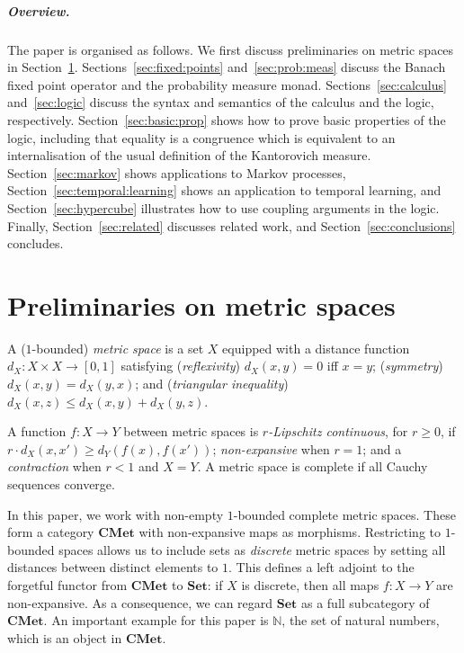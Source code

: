 \documentclass[a4paper,UKenglish,cleveref, autoref, thm-restate]{lipics-v2021}
\newcommand{\cat}[1]{\mathbf{#1}}
\newcommand{\CMet}{\cat{CMet}}
\newcommand{\Set}{\cat{Set}}
\newcommand{\nat}{\mathbb{N}}
\newcommand{\uinterval}{[0,1]}
\begin{document}
\subparagraph*{Overview.} The paper is organised as follows. We first discuss preliminaries on metric spaces in 
Section~\ref{sec:prelim}. Sections~\ref{sec:fixed:points} and~\ref{sec:prob:meas} discuss the 
Banach fixed point operator and the probability measure monad. Sections~\ref{sec:calculus} and~\ref{sec:logic}
discuss the syntax and semantics of the calculus and the logic, respectively. 
Section~\ref{sec:basic:prop} shows how to prove basic properties of the logic, including that equality is a congruence 
which is equivalent to an internalisation of the 
usual definition of the Kantorovich measure. Section~\ref{sec:markov} shows applications to Markov processes, 
Section~\ref{sec:temporal:learning} shows an application to temporal learning, and Section~\ref{sec:hypercube}
illustrates how to use coupling arguments in the logic. 
Finally, Section~\ref{sec:related} discusses related work, and 
Section~\ref{sec:conclusions} concludes. 

\section{Preliminaries on metric spaces}
\label{sec:prelim}

A ($1$-bounded) \emph{metric space} is a set $X$ equipped with a
distance function $d_X \colon X \times X \to \uinterval$ satisfying (\emph{reflexivity}) $d_X(x,y) =0$ iff $x=y$; (\emph{symmetry}) $d_X(x,y) = d_X(y,x)$; and (\emph{triangular inequality}) $d_X(x,z) \leq d_X(x,y) + d_X(y,z)$. 

A function $f \colon X \to Y$ between metric spaces is \emph{$r$-Lipschitz continuous}, for $r\geq 0$, if $r \cdot d_X(x,x') \geq  d_Y(f(x),f(x'))$; \emph{non-expansive} when $r = 1$; and a \emph{contraction} when $r < 1$ and $X = Y$. 
A metric space is complete if all Cauchy sequences converge. 

\smallskip
In this paper, we work with non-empty $1$-bounded complete metric spaces. 
These form a category $\CMet$ with non-expansive maps as morphisms. 
Restricting to $1$-bounded spaces allows us to include sets as \emph{discrete} metric spaces by setting all distances between distinct elements to $1$. 
This defines a left adjoint to the forgetful functor from $\CMet$ to $\Set$: if $X$ is discrete, then all maps 
$f\colon X \to Y$ are non-expansive. 
As a consequence, we can regard $\Set$ as a full subcategory of $\CMet$. 
 An important example for this paper is $\nat$, the set of natural numbers, which is an object in $\CMet$.
\end{document}
